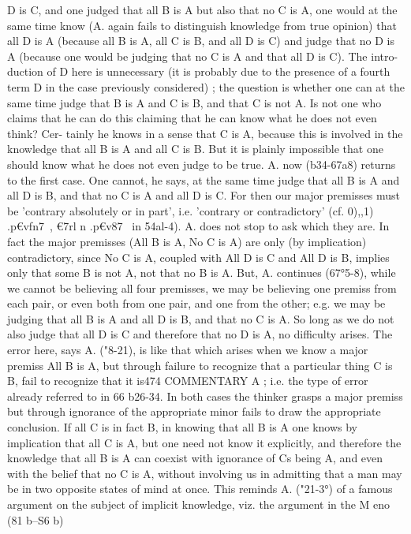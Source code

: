 {{{{{{{D is C, and one judged that all B is A but also that no C is A,
one would at the same time know (A. again fails to distinguish
knowledge from true opinion) that all D is A (because all B is A,
all C is B, and all D is C) and judge that no D is A (because one
would be judging that no C is A and that all D is C). The intro-
duction of D here is unnecessary (it is probably due to the presence
of a fourth term D in the case previously considered) ; the question
is whether one can at the same time judge that B is A and C is B,
and that C is not A. Is not one who claims that he can do this
claiming that he can know what he does not even think? Cer-
tainly he knows in a sense that C is A, because this is involved
in the knowledge that all B is A and all C is B. But it is plainly
impossible that one should know what he does not even judge
to be true.
A. now (b34-67a8) returns to the first case. One cannot, he
says, at the same time judge that all B is A and all D is B, and
that no C is A and all D is C. For then our major premisses must
be 'contrary absolutely or in part', i.e. 'contrary or contradictory'
(cf. 0),,1) .p€vfn7~, €7rl n .p€v87}~ in 54al-4). A. does not stop to ask
which they are. In fact the major premisses (All B is A, No C
is A) are only (by implication) contradictory, since No C is A,
coupled with All D is C and All D is B, implies only that some B
is not A, not that no B is A.
But, A. continues (67°5-8), while we cannot be believing all four
premisses, we may be believing one premiss from each pair,
or even both from one pair, and one from the other; e.g. we may
be judging that all B is A and all D is B, and that no C is A.
So long as we do not also judge that all D is C and therefore that
no D is A, no difficulty arises.
The error here, says A. ("8-21), is like that which arises when
we know a major premiss All B is A, but through failure to
recognize that a particular thing C is B, fail to recognize that it is474
COMMENTARY
A ; i.e. the type of error already referred to in 66 b26-34. In both
cases the thinker grasps a major premiss but through ignorance
of the appropriate minor fails to draw the appropriate conclusion.
If all C is in fact B, in knowing that all B is A one knows by
implication that all C is A, but one need not know it explicitly,
and therefore the knowledge that all B is A can coexist with
ignorance of Cs being A, and even with the belief that no C is
A, without involving us in admitting that a man may be in two
opposite states of mind at once.
This reminds A. ("21-3°) of a famous argument on the subject
of implicit knowledge, viz. the argument in the M eno (81 b--S6 b)
}}}}}}
